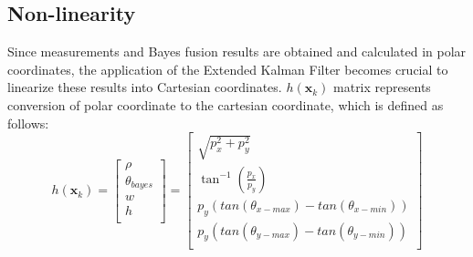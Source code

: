 \newpage
\subsection{Non-linearity}\label{equ:2_non_linear}
Since measurements and Bayes fusion results are obtained and calculated in polar coordinates, 
the application of the Extended Kalman Filter becomes crucial to linearize these results into Cartesian coordinates. 
$h(\mathbf{x}_k)$ matrix represents conversion of polar coordinate to the cartesian coordinate, which is defined as follows:
\begin{equation}
    h(\mathbf{x}_k)=
    \begin{bmatrix}
        \rho \\ 
        \theta_{bayes}\\
        w\\
        h\\
    \end{bmatrix}=
    \begin{bmatrix}
    \sqrt{p_x^2+p_y^2}\\
    \tan^{-1}(\frac{p_x}{p_y})\\
    p_y (tan(\theta_{x-max}) - tan(\theta_{x-min}))\\
    p_y (tan(\theta_{y-max}) - tan(\theta_{y-min}))\\
    \end{bmatrix}
\end{equation}

